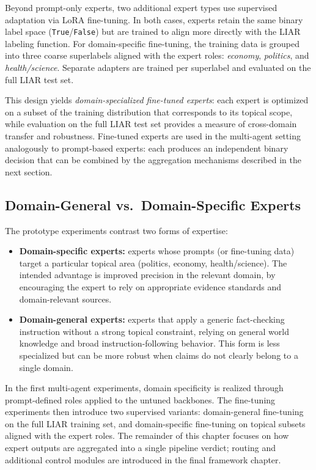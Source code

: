 Beyond prompt-only experts, two additional expert types use supervised adaptation via LoRA fine-tuning. In both cases, experts retain the same binary label space (\texttt{True}/\texttt{False}) but are trained to align more directly with the LIAR labeling function. For domain-specific fine-tuning, the training data is grouped into three coarse superlabels aligned with the expert roles: \textit{economy}, \textit{politics}, and \textit{health/science}. Separate adapters are trained per superlabel and evaluated on the full LIAR test set.

This design yields \emph{domain-specialized fine-tuned experts}: each expert is optimized on a subset of the training distribution that corresponds to its topical scope, while evaluation on the full LIAR test set provides a measure of cross-domain transfer and robustness. Fine-tuned experts are used in the multi-agent setting analogously to prompt-based experts: each produces an independent binary decision that can be combined by the aggregation mechanisms described in the next section.

\subsection{Domain-General vs.\ Domain-Specific Experts}

The prototype experiments contrast two forms of expertise:

\begin{itemize}
    \item \textbf{Domain-specific experts:} experts whose prompts (or fine-tuning data) target a particular topical area (politics, economy, health/science). The intended advantage is improved precision in the relevant domain, by encouraging the expert to rely on appropriate evidence standards and domain-relevant sources.
    \item \textbf{Domain-general experts:} experts that apply a generic fact-checking instruction without a strong topical constraint, relying on general world knowledge and broad instruction-following behavior. This form is less specialized but can be more robust when claims do not clearly belong to a single domain.
\end{itemize}

In the first multi-agent experiments, domain specificity is realized through prompt-defined roles applied to the untuned backbones. The fine-tuning experiments then introduce two supervised variants: domain-general fine-tuning on the full LIAR training set, and domain-specific fine-tuning on topical subsets aligned with the expert roles. The remainder of this chapter focuses on how expert outputs are aggregated into a single pipeline verdict; routing and additional control modules are introduced in the final framework chapter.

